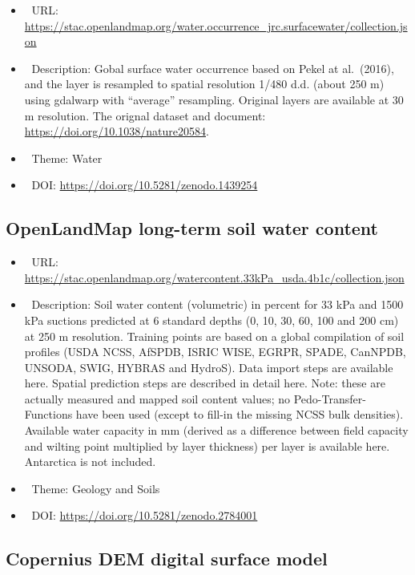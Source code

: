 \documentclass[
  graybox,natbib,nospthms]{svmono}
\providecommand{\tightlist}{%
  \setlength{\itemsep}{0pt}\setlength{\parskip}{0pt}}
\providecommand{\tightlist}{\setlength{\itemsep}{0pt}\setlength{\parskip}{0pt}}
\begin{document}
\begin{itemize}
\tightlist
\item
  🔗 URL: \url{https://stac.openlandmap.org/water.occurrence_jrc.surfacewater/collection.json}
\item
  📰 Description: Gobal surface water occurrence based on Pekel at al.~(2016), and the layer is resampled to spatial resolution 1/480 d.d. (about 250 m) using gdalwarp with ``average'' resampling. Original layers are available at 30 m resolution. The orignal dataset and document: \url{https://doi.org/10.1038/nature20584}.
\item
  📝 Theme: Water
\item
  📂 DOI: \url{https://doi.org/10.5281/zenodo.1439254}
\end{itemize}

\hypertarget{openlandmap-long-term-soil-water-content}{%
\subsection{OpenLandMap long-term soil water content}\label{openlandmap-long-term-soil-water-content}}

\begin{itemize}
\tightlist
\item
  🔗 URL: \url{https://stac.openlandmap.org/watercontent.33kPa_usda.4b1c/collection.json}
\item
  📰 Description: Soil water content (volumetric) in percent for 33 kPa and 1500 kPa suctions predicted at 6 standard depths (0, 10, 30, 60, 100 and 200 cm) at 250 m resolution. Training points are based on a global compilation of soil profiles (USDA NCSS, AfSPDB, ISRIC WISE, EGRPR, SPADE, CanNPDB, UNSODA, SWIG, HYBRAS and HydroS). Data import steps are available here. Spatial prediction steps are described in detail here. Note: these are actually measured and mapped soil content values; no Pedo-Transfer-Functions have been used (except to fill-in the missing NCSS bulk densities). Available water capacity in mm (derived as a difference between field capacity and wilting point multiplied by layer thickness) per layer is available here. Antarctica is not included.
\item
  📝 Theme: Geology and Soils
\item
  📂 DOI: \url{https://doi.org/10.5281/zenodo.2784001}
\end{itemize}

\hypertarget{copernius-dem-digital-surface-model}{%
\subsection{Copernius DEM digital surface model}\label{copernius-dem-digital-surface-model}}
\end{document}
